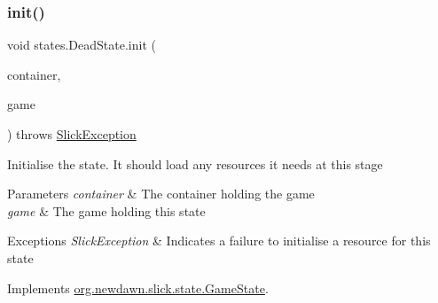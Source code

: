 \subsubsection{\texorpdfstring{init()}{init()}}
{\footnotesize\ttfamily void states.\+Dead\+State.\+init (\begin{DoxyParamCaption}\item[{\mbox{\hyperlink{classorg_1_1newdawn_1_1slick_1_1_game_container}{Game\+Container}}}]{container,  }\item[{final \mbox{\hyperlink{classorg_1_1newdawn_1_1slick_1_1state_1_1_state_based_game}{State\+Based\+Game}}}]{game }\end{DoxyParamCaption}) throws \mbox{\hyperlink{classorg_1_1newdawn_1_1slick_1_1_slick_exception}{Slick\+Exception}}\hspace{0.3cm}{\ttfamily [inline]}}

Initialise the state. It should load any resources it needs at this stage


\begin{DoxyParams}{Parameters}
{\em container} & The container holding the game \\
\hline
{\em game} & The game holding this state \\
\hline
\end{DoxyParams}

\begin{DoxyExceptions}{Exceptions}
{\em Slick\+Exception} & Indicates a failure to initialise a resource for this state \\
\hline
\end{DoxyExceptions}


Implements \mbox{\hyperlink{interfaceorg_1_1newdawn_1_1slick_1_1state_1_1_game_state_aa799a369e0fcfe6822d2d586fa6f5bbc}{org.\+newdawn.\+slick.\+state.\+Game\+State}}.


